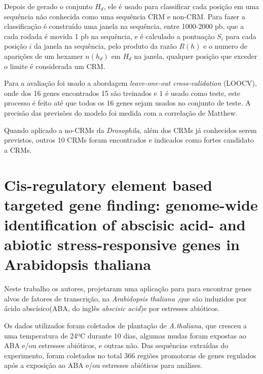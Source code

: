 Depois de gerado o conjunto $H_{d}$, ele é usado para classificar cada posição em uma sequência não conhecida como uma sequência CRM e non-CRM. Para fazer a classificação é construído uma janela na sequência, entre 1000-2000 pb, que a cada rodada é movida 1 pb na sequência, e é calculado a pontuação $S_{i}$ para cada posição $i$ da janela na sequência, pelo produto da razão $R(h)$ e o numero de aparições de um hexamer $n(h_{d})$ em $H_{d}$ na janela, qualquer posição que exceder o limite é considerada um CRM.

Para a avaliação foi usado a abordagem  \textit{leave-one-out cross-validation} (LOOCV), onde dos 16 genes encontrados 15 são treinados e 1 é usado como teste, este processo é feito até que todos os 16 genes sejam usados no conjunto de teste. A precisão das previsões do modelo foi medida com a correlação de Matthew. 

Quando aplicado a no-CRMs da \textit{Drosophila}, além dos CRMs já conhecidos serem previstos, outros 10 CRMs foram encontrados e indicados como fortes candidato a CRMs.





\section{Cis-regulatory element based targeted gene finding: genome-wide identification of abscisic acid- and abiotic stress-responsive genes in Arabidopsis thaliana \cite{Zhang2005}}

Neste trabalho os autores, projetaram uma aplicação para para encontrar genes alvos de fatores de transcrição, na \textit{Arabidopsis thaliana} ,que são induzidos por ácido abscísico(ABA, do inglês \textit{abscisic acid})e por estresses abióticos.

Os dados utilizados foram coletados de plantação de \textit{A.thaliana}, que cresceu a uma temperatura de 24ºC durante 10 dias, algumas mudas foram expostas ao ABA e/ou estresses abióticos, e outras não. Das sequências extraídas do experimento, foram coletados no total 366 regiões promotoras de genes regulados após a exposição ao ABA e/ou estresses abióticos para análises.

